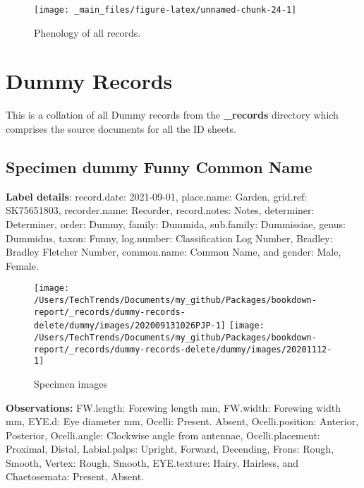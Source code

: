 \documentclass[
]{article}
\begin{document}
\begin{figure}[p]

{\centering \texttt{[image: \_main\_files/figure-latex/unnamed-chunk-24-1]} 

}

\caption{Phenology of all records.}\label{fig:unnamed-chunk-24}
\end{figure}

\hypertarget{dummy-records-1}{%
\section{Dummy Records}\label{dummy-records-1}}

This is a collation of all Dummy records from the \textbf{\_records} directory which comprises the source documents for all the ID sheets.

\hypertarget{specimen-dummy-funny-common-name-1}{%
\subsection*{Specimen dummy Funny Common Name}\label{specimen-dummy-funny-common-name-1}}

\textbf{Label details}:
record.date: 2021-09-01, place.name: Garden, grid.ref: SK75651803, recorder.name: Recorder, record.notes: Notes, determiner: Determiner, order: Dummy, family: Dummida, sub.family: Dummissiae, genus: Dummidus, taxon: Funny, log.number: Classification Log Number, Bradley: Bradley Fletcher Number, common.name: Common Name, and gender: Male, Female.

\begin{figure}[p]

{\centering \texttt{[image: /Users/TechTrends/Documents/my\_github/Packages/bookdown-report/\_records/dummy-records-delete/dummy/images/202009131026PJP-1]} \texttt{[image: /Users/TechTrends/Documents/my\_github/Packages/bookdown-report/\_records/dummy-records-delete/dummy/images/20201112-1]} 

}

\caption{Specimen images}\label{fig:unnamed-chunk-31}
\end{figure}

\textbf{Observations:} FW.length: Forewing length mm, FW.width: Forewing width mm, EYE.d: Eye diameter mm, Ocelli: Present. Absent, Ocelli.position: Anterior, Posterior, Ocelli.angle: Clockwise angle from antennae, Ocelli.placement: Proximal, Distal, Labial.palps: Upright, Forward, Decending, Frons: Rough, Smooth, Vertex: Rough, Smooth, EYE.texture: Hairy, Hairless, and Chaetosemata: Present, Absent.
\end{document}
